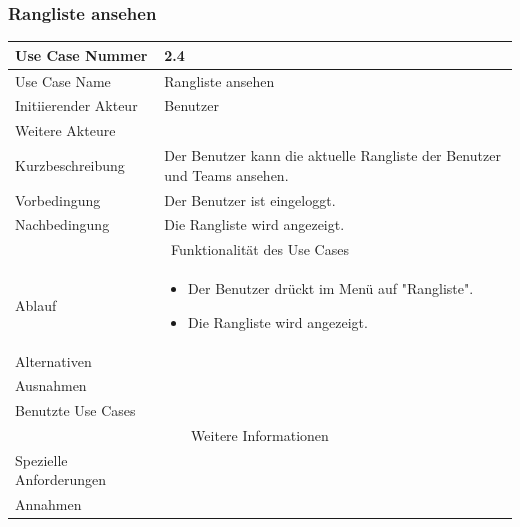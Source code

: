 \documentclass[10pt,a4paper]{article}
\begin{document}
\subsubsection{Rangliste ansehen}
	\begin{tabular}{|l|p{.5\linewidth}|}
	\hline Use Case Nummer & 2.4 \\ 
	\hline Use Case Name & Rangliste ansehen\\ 
	\hline Initiierender Akteur & Benutzer \\
	\hline Weitere Akteure &  \\
	\hline Kurzbeschreibung & Der Benutzer kann die aktuelle Rangliste der Benutzer und Teams ansehen. \\
	\hline Vorbedingung & Der Benutzer ist eingeloggt. \\
	\hline Nachbedingung & Die Rangliste wird angezeigt. \\
	\hline \multicolumn{2}{|c|}{Funktionalität des Use Cases}\\
	\hline Ablauf & \begin{itemize}
		\item Der Benutzer drückt im Menü auf "Rangliste".
		\item Die Rangliste wird angezeigt.
	\end{itemize} \\
	\hline Alternativen &  \\
	\hline Ausnahmen &  \\
	\hline Benutzte Use Cases &  \\
	\hline \multicolumn{2}{|c|}{Weitere Informationen} \\
	\hline Spezielle Anforderungen &  \\
	\hline Annahmen &  \\
	\hline
	\end{tabular}
\end{document}
